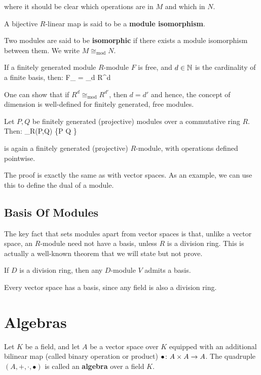 where it should be clear which operations are in $M$ and which in $N$.
\ed

A bijective $R$-linear map is said to be a \textbf{module isomorphism}.
\ed

Two modules are said to be \textbf{isomorphic} if there exists a module isomorphism between them. We write
$M\cong_{\mathrm{mod}}N$.
\ed

\bt[]
If a finitely generated module $R$-module $F$ is free, and $d\in \mathbb{N}$ is the cardinality of a finite basis, then:
\bse
F\cong_ = _{d } \eqqcolon R^d
\ese
\et

One can show that if $R^d\cong_\mathrm{mod} R^{d'}$, then $d=d'$ and hence, the concept of dimension is well-defined
for finitely generated, free modules.

\bt[]
Let $P,Q$ be finitely generated (projective) modules over a commutative ring $R$. Then:
\bse
\Hom_R(P,Q) \coloneqq \{\phi\cl P \xrightarrow{\sim} Q \mid \phi {}\}
\ese

is again a finitely generated (projective) $R$-module, with operations defined pointwise.
\et

The proof is exactly the same as with vector spaces. As an example, we can use this to define the dual of a module.

\subsection{Basis Of Modules}

The key fact that sets modules apart from vector spaces is that, unlike a vector space, an $R$-module need not have a
basis, unless $R$ is a division ring. This is actually a well-known theorem that we will state but not prove.

\bt[]
If $D$ is a division ring, then any $D$-module $V$ admits a basis.
\et

\bt[]
Every vector space has a basis, since any field is also a division ring.
\et

\section{Algebras}

\bd[Algebra]
Let $K$ be a field, and let $A$ be a vector space over $K$ equipped with an additional bilinear map (called binary
operation or product) $\bullet \colon A\times A \to A$. The quadruple $(A,+, \cdot,\bullet)$ is called an
\textbf{algebra} over a field $K$.
\ed

